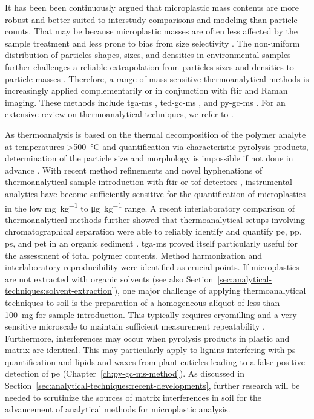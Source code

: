 It has been been continuously argued that microplastic mass contents are more robust and better suited to interstudy comparisons and modeling than particle counts. That may be because microplastic masses are often less affected by the sample treatment and less prone to bias from size selectivity \citep{SimonQuantification2018,BraunMicroplastics2018}. The non-uniform distribution of particles shapes, sizes, and densities in environmental samples further challenges a reliable extrapolation from particles sizes and densities to particle masses \citep{BraunMicroplastics2018}. Therefore, a range of mass-sensitive thermoanalytical methods is increasingly applied complementarily or in conjunction with \ac{ftir} and Raman imaging. These methods include \ac{tga-ms} \citep[Chapter~\ref{ch:tga-ms-method};][]{BoyronAdvanced2019}, \ac{ted-gc-ms} \citep{DumichenFast2017}, and \ac{py-gc-ms} \citep{FischerSimultaneous2017,FischerMicroplastics2019}. For an extensive review on thermoanalytical techniques, we refer to \citet{LaNasaReview2020}.

As thermoanalysis is based on the thermal decomposition of the polymer analyte at temperatures \SI{>500}{\degreeCelsius} and quantification via characteristic pyrolysis products, determination of the particle size and morphology is impossible if not done in advance \citep{NguyenSeparation2019,DumichenFast2017}. With recent method refinements \citep[Chapter~\ref{ch:py-gc-ms-method};][]{DierkesQuantification2019} and novel hyphenations of thermoanalytical sample introduction with \ac{ftir} or \ac{tof} detectors \citep{SullivanDetection2020}, instrumental analytics have become sufficiently sensitive for the quantification of microplastics in the low \si{\milli\gram\per\kilo\gram} to \si{\micro\gram\per\kilo\gram} range. A recent interlaboratory comparison of thermoanalytical methods further showed that thermoanalytical setups involving chromatographical separation were able to reliably identify and quantify \ac{pe}, \ac{pp}, \ac{ps}, and \ac{pet} in an organic sediment \citep{BeckerQuantification2020}. \ac{tga-ms} proved itself particularly useful for the assessment of total polymer contents.
Method harmonization and interlaboratory reproducibility were identified as crucial points. If microplastics are not extracted with organic solvents (see also Section~\ref{sec:analytical-techniques:solvent-extraction}), one major challenge of applying thermoanalytical techniques to soil is the preparation of a homogeneous aliquot of less than \SI{100}{\milli\gram} for sample introduction. This typically requires cryomilling and a very sensitive microscale to maintain sufficient measurement repeatability \citep[Chapter~\ref{ch:py-gc-ms-method};][]{DierkesQuantification2019}.
Furthermore, interferences may occur when pyrolysis products in plastic and matrix are identical. This may particularly apply to lignins interfering with \ac{ps} quantification \citep{FischerSimultaneous2017} and lipids and waxes from plant cuticles leading to a false positive detection of \ac{pe} (Chapter~\ref{ch:py-gc-ms-method}). As discussed in Section~\ref{sec:analytical-techniques:recent-developments}, further research will be needed to scrutinize the sources of matrix interferences in soil for the advancement of analytical methods for microplastic analysis.

